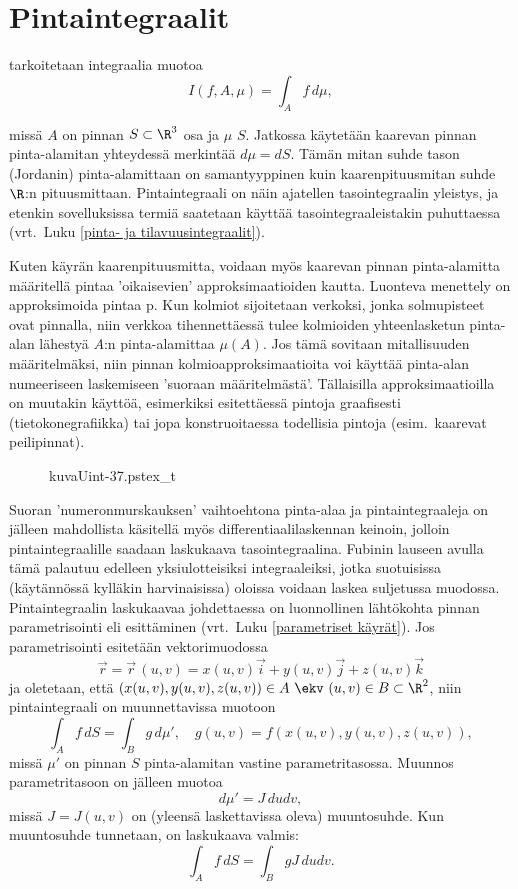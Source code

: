 \section{Pintaintegraalit} \label{pintaintegraalit}
\alku
{}


 tarkoitetaan integraalia muotoa
\[
I(f,A,\mu)=\int_A f\,d\mu,
\]

missä $A$ on pinnan $S \subset \R^ 3$ osa ja $\mu$ 
 $S$.
Jatkossa käytetään kaarevan pinnan pinta-alamitan yhteydessä merkintää $d\mu=dS$. Tämän mitan
suhde tason (Jordanin) pinta-alamittaan on samantyyppinen kuin kaarenpituusmitan suhde $\R$:n
pituusmittaan. Pintaintegraali on näin ajatellen tasointegraalin yleistys, ja etenkin
sovelluksissa termiä saatetaan käyttää tasointegraaleistakin puhuttaessa
(vrt.\ Luku \ref{pinta- ja tilavuusintegraalit}).

Kuten käyrän kaarenpituusmitta, voidaan myös kaarevan pinnan pinta-alamitta määritellä pintaa
'oikaisevien' approksimaatioiden kautta. Luonteva menettely on approksimoida pintaa 
  p. Kun kolmiot sijoitetaan verkoksi,
jonka solmupisteet ovat pinnalla, niin verkkoa tihennettäessä tulee kolmioiden yhteenlasketun
pinta-alan lähestyä $A$:n pinta-alamittaa $\mu(A)$. Jos tämä sovitaan mitallisuuden 
määritelmäksi, niin pinnan kolmioapproksimaatioita voi käyttää pinta-alan numeeriseen 
laskemiseen 'suoraan määritelmästä'. Tällaisilla approksimaatioilla on muutakin käyttöä, 
esimerkiksi esitettäessä pintoja graafisesti (tietokonegrafiikka) tai jopa konstruoitaessa 
todellisia pintoja (esim.\ kaarevat peilipinnat).
\begin{figure}[H]
\begin{center}
{kuvaUint-37.pstex_t}
\end{center}
\end{figure}
Suoran 'numeronmurskauksen' vaihtoehtona pinta-alaa ja pintaintegraaleja on jälleen mahdollista
käsitellä myös differentiaalilaskennan keinoin, jolloin pintaintegraalille saadaan laskukaava
tasointegraalina. Fubinin lauseen avulla tämä palautuu edelleen yksiulotteisiksi integraaleiksi,
jotka suotuisissa (käytännössä kylläkin harvinaisissa) oloissa voidaan laskea suljetussa
muodossa. Pintaintegraalin laskukaavaa johdettaessa on luonnollinen lähtökohta pinnan 
%
parametrisointi eli esittäminen 
(vrt.\ Luku \ref{parametriset käyrät}). Jos parametrisointi esitetään vektorimuodossa 
\[
\vec r = \vec r\,(u,v) = x(u,v)\vec i + y(u,v)\vec j + z(u,v)\vec k
\]
ja oletetaan, että $(x(u,v),y(u,v),z(u,v)) \in A\ \ekv\ (u,v) \in B \subset \R^2$, niin 
pintaintegraali on muunnettavissa muotoon
\[
\int_A f\,dS=\int_B g\,d\mu', \quad g(u,v)=f(x(u,v),y(u,v),z(u,v)),
\]
missä $\mu'$ on pinnan $S$ pinta-alamitan vastine parametritasossa. Muunnos parametritasoon on
jälleen muotoa
\[
d\mu'=J\,dudv,
\]
missä $J=J(u,v)$ on (yleensä laskettavissa oleva) muuntosuhde. Kun muuntosuhde tunnetaan, on
laskukaava valmis:
\[
\int_A f\,dS=\int_B gJ\,dudv.
\]

